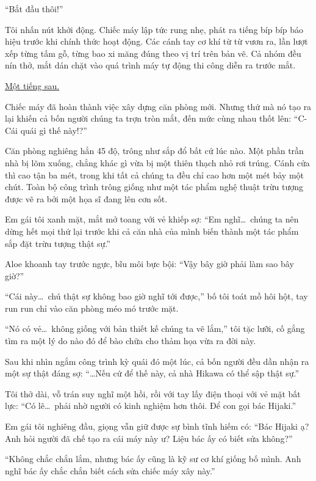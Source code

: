 \documentclass[../main.tex]{subfiles}
\begin{document}
``Bắt đầu thôi!''

Tôi nhấn nút khởi động. Chiếc máy lập tức rung nhẹ, phát ra tiếng bíp bíp báo hiệu trước khi chính thức hoạt động. Các cánh tay cơ khí từ từ vươn ra, lần lượt xếp từng tấm gỗ, từng bao xi măng đúng theo vị trí trên bản vẽ. Cả nhóm đều nín thở, mắt dán chặt vào quá trình máy tự động thi công diễn ra trước mắt.

\begin{center}
    \uline{Một tiếng sau.}
\end{center}

Chiếc máy đã hoàn thành việc xây dựng căn phòng mới. Nhưng thứ mà nó tạo ra lại khiến cả bốn người chúng ta trợn tròn mắt, đến mức cùng nhau thốt lên: ``C-Cái quái gì thế này!?''

Căn phòng nghiêng hẳn 45 độ, trông như sắp đổ bất cứ lúc nào. Một phần trần nhà bị lõm xuống, chẳng khác gì vừa bị một thiên thạch nhỏ rơi trúng. Cánh cửa thì cao tận ba mét, trong khi tất cả chúng ta đều chỉ cao hơn một mét bảy một chút. Toàn bộ công trình trông giống như một tác phẩm nghệ thuật trừu tượng được vẽ ra bởi một họa sĩ đang lên cơn sốt.

Em gái tôi xanh mặt, mắt mở toang với vẻ khiếp sợ: ``Em nghĩ\dots\ chúng ta nên dừng hết mọi thứ lại trước khi cả căn nhà của mình biến thành một tác phẩm sắp đặt trừu tượng thật sự.''

Aloe khoanh tay trước ngực, bĩu môi bực bội: ``Vậy bây giờ phải làm sao bây giờ?''

``Cái này\dots\ chú thật sự không bao giờ nghĩ tới được,'' bố tôi toát mồ hôi hột, tay run run chỉ vào căn phòng méo mó trước mặt.

``Nó có vẻ\dots\ không giống với bản thiết kế chúng ta vẽ lắm,'' tôi tặc lưỡi, cố gắng tìm ra một lý do nào đó để bào chữa cho thảm họa vừa ra đời này.

Sau khi nhìn ngắm công trình kỳ quái đó một lúc, cả bốn người đều dần nhận ra một sự thật đáng sợ: ``\dots Nếu cứ để thế này, cả nhà Hikawa có thể sập thật sự.''

Tôi thở dài, vỗ trán suy nghĩ một hồi, rồi với tay lấy điện thoại với vẻ mặt bất lực: ``Có lẽ\dots\ phải nhờ người có kinh nghiệm hơn thôi. Để con gọi bác Hijaki.''

Em gái tôi nghiêng đầu, giọng vẫn giữ được sự bình tĩnh hiếm có: ``Bác Hijaki ạ? Anh hỏi người đã chế tạo ra cái máy này ư? Liệu bác ấy có biết sửa không?''

``Không chắc chắn lắm, nhưng bác ấy cũng là kỹ sư cơ khí giống bố mình. Anh nghĩ bác ấy chắc chắn biết cách sửa chiếc máy xây này.''
\end{document}
